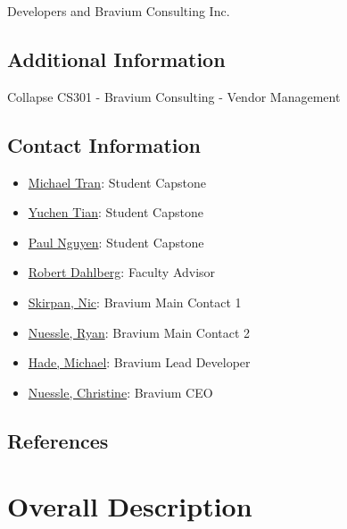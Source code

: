 \documentclass[10pt]{article}
\begin{document}
Developers and Bravium Consulting Inc.

\subsection{Additional Information}

Collapse CS301 - Bravium Consulting - Vendor Management

\subsection{Contact Information}

\begin{itemize}
	\item\href{tranml3@mymail.vcu.edu}{Michael Tran}: Student Capstone 
	\item\href{tiany4@mymail.vcu.edu}{Yuchen Tian}: Student Capstone 
	\item\href{nguyenp22@mymail.vcu.edu}{Paul Nguyen}: Student Capstone 
	\item\href{dahlbergra@mymail.vcu.edu}{Robert Dahlberg}: Faculty Advisor
	\item\href{nskirpan@braviumconsulting.com}{Skirpan, Nic}: Bravium Main Contact 1
	\item\href{rnuessle@braviumconsulting.com}{Nuessle, Ryan}: Bravium Main Contact 2
	\item\href{mhade@braviumconsulting.com}{Hade, Michael}: Bravium Lead Developer
	\item\href{cnuessle@braviumconsulting.com}{Nuessle, Christine}: Bravium CEO

\end{itemize}

\subsection{References}

\lipsum[10]








\section{Overall Description}
\end{document}

